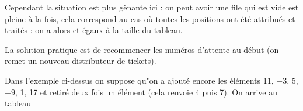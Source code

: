 Cependant la situation est plus gênante ici : on peut avoir une file qui est vide est pleine à la fois, cela correspond au cas où toutes les positions ont été attribués et traités : on a alors  et  égaux à la taille du tableau. 

La solution pratique est de recommencer les numéros d'attente au début (on remet un nouveau distributeur de tickets).

\medskip

Dans l'exemple ci-dessus on suppose qu"on a ajouté encore les éléments 11, $-3$, 5, $-9$, 1, 17 et retiré deux fois un élément (cela renvoie 4 puis 7).
On arrive au tableau
\begin{center}
\end{center}

